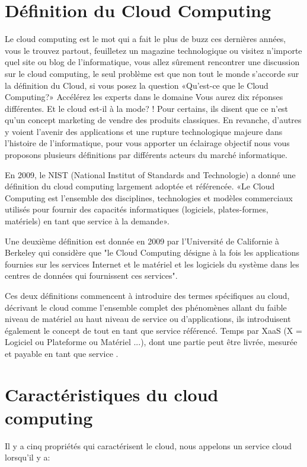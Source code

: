 \section{Définition du Cloud Computing}
Le cloud computing est le mot qui a fait le plus de buzz ces dernières années, vous le trouvez partout, feuilletez un magazine technologique ou visitez n'importe quel site ou blog de l'informatique, vous allez sûrement rencontrer une discussion sur le cloud computing, le seul problème est que non tout le monde s'accorde sur la définition du Cloud, si vous posez la question «Qu'est-ce que le Cloud Computing?» Accélérez les experts dans le domaine Vous aurez dix réponses différentes. Et le cloud est-il à la mode? ! Pour certains, ils disent que ce n'est qu'un concept marketing de vendre des produits classiques. En revanche, d'autres y voient l'avenir des applications et une rupture technologique majeure dans l'histoire de l'informatique, pour vous apporter un éclairage objectif nous vous proposons plusieurs définitions par différents acteurs du marché informatique.


En 2009, le NIST (National Institut of Standards and Technologie) a donné une définition du cloud computing largement adoptée et référencée. «Le Cloud Computing est l'ensemble des disciplines, technologies et modèles commerciaux utilisés pour fournir des capacités informatiques (logiciels, plates-formes, matériels) en tant que service à la demande».


Une deuxième définition est donnée en 2009 par l'Université de Californie à Berkeley qui considère que "le Cloud Computing désigne à la fois les applications fournies sur les services Internet et le matériel et les logiciels du système dans les centres de données qui fournissent ces services".



Ces deux définitions commencent à introduire des termes spécifiques au cloud, décrivant le cloud comme l'ensemble complet des phénomènes allant du faible niveau de matériel au haut niveau de service ou d'applications, ils introduisent également le concept de tout en tant que service référencé. Temps par XaaS (X = Logiciel ou Plateforme ou Matériel ...), dont une partie peut être livrée, mesurée et payable en tant que service \cite{c2}.

\section{Caractéristiques du cloud computing }
Il y a cinq propriétés qui caractérisent le cloud, nous appelons un service cloud lorsqu'il y a:
